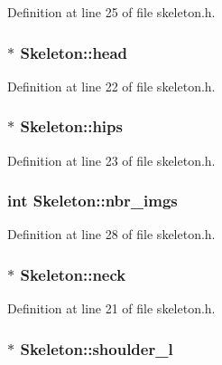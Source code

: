 Definition at line 25 of file skeleton.\+h.

\hypertarget{class_skeleton_a14e43c932ccae2c28d9fa6ba689166fe}{
\subsubsection[{head}]{$\ast$ Skeleton\+::head}}\label{class_skeleton_a14e43c932ccae2c28d9fa6ba689166fe}


Definition at line 22 of file skeleton.\+h.

\hypertarget{class_skeleton_ae03a158780d9cd9fca8f98001a836c75}{
\subsubsection[{hips}]{$\ast$ Skeleton\+::hips}}\label{class_skeleton_ae03a158780d9cd9fca8f98001a836c75}


Definition at line 23 of file skeleton.\+h.

\hypertarget{class_skeleton_a0c481346ada398ff1e9d9763aa46b7c5}{
\subsubsection[{nbr\+\_\+imgs}]{\setlength{\rightskip}{0pt plus 5cm}int Skeleton\+::nbr\+\_\+imgs}}\label{class_skeleton_a0c481346ada398ff1e9d9763aa46b7c5}


Definition at line 28 of file skeleton.\+h.

\hypertarget{class_skeleton_ab3d170bea51a2fd6997754c1e4b925f6}{
\subsubsection[{neck}]{$\ast$ Skeleton\+::neck}}\label{class_skeleton_ab3d170bea51a2fd6997754c1e4b925f6}


Definition at line 21 of file skeleton.\+h.

\hypertarget{class_skeleton_a76cd871e49748946effbcf383b331dc3}{
\subsubsection[{shoulder\+\_\+l}]{ $\ast$ Skeleton\+::shoulder\+\_\+l}}\label{class_skeleton_a76cd871e49748946effbcf383b331dc3}


